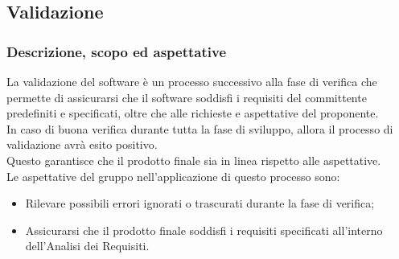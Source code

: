 \subsection{Validazione}

\subsubsection{Descrizione, scopo ed aspettative}

La validazione del software è un processo successivo alla fase di verifica che permette di assicurarsi che il software soddisfi i requisiti del committente predefiniti e specificati,
oltre che alle richieste e aspettative del proponente. \\

In caso di buona verifica durante tutta la fase di sviluppo, allora il processo di validazione avrà esito positivo. \\
Questo garantisce che il prodotto finale sia in linea rispetto alle aspettative. \\

Le aspettative del gruppo nell'applicazione di questo processo sono:
\begin{itemize}
    \item Rilevare possibili errori ignorati o trascurati durante la fase di verifica;
    \item Assicurarsi che il prodotto finale soddisfi i requisiti specificati all'interno dell'Analisi dei Requisiti.
\end{itemize}

